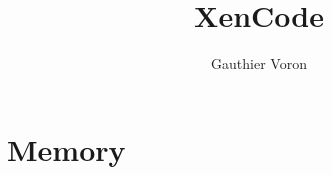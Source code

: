 \documentclass{report}
\title{XenCode}
\author{Gauthier Voron}
\begin{document}
\maketitle

\chapter{Memory}

\end{document}
